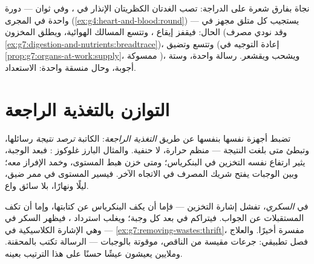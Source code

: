 \begin{example}\label{ex:g8:hormonal-communication:alarm}
نجاة بفارق شعرة على الدراجة: تصب الغدتان الكظريتان
 الإنذار في ، وفي ثوان --- دورة واحدة في
المجرى (\cref{ex:g4:heart-and-blood:round}) --- يستجيب
كل متلق مجهز في الحال: فيقفز إيقاع ، وتتسع المسالك
الهوائية، ويطلق   المخزون (وقد نودي مصرف
\cref{ex:g7:digestion-and-nutrients:breadtrace})، وتتسع
  وتضيق   (إعادة التوجيه
في \cref{prop:g7:organs-at-work:supply}، ممسوكة
)، ويشحب  ويقشعر. رسالة واحدة، وستة أجوبة،
وحال منسقة واحدة: الاستعداد.
\end{example}

\section{التوازن بالتغذية الراجعة}

\begin{proposition}\label{prop:g8:hormonal-communication:feedback}
تضبط أجهزة  نفسها بنفسها عن طريق \emph{التغذية
الراجعة}:  الكاتبة \emph{ترصد
نتيجة} رسائلها، وتبطئ متى بلغت النتيجة --- منظم حرارة،
لا حنفية. والمثال البارز غلوكوز : فبعد الوجبة، يثير
ارتفاع  نفسه  التخزين في البنكرياس؛ ومتى
خزن  هبط المستوى، وخمد الإفراز معه؛ وبين الوجبات
يفتح  شريك المصرف في الاتجاه الآخر. فيسير المستوى
في ممر ضيق، ليلًا ونهارًا، بلا سائق واع.
\end{proposition}
\admitted

\begin{example}\label{ex:g8:hormonal-communication:diabetes}
في \emph{السكري}، تفشل إشارة  التخزين
--- فإما أن يكف البنكرياس عن كتابتها، وإما أن تكف
المستقبلات عن الجواب. فيتراكم  في  بعد كل
وجبة؛ ويغلب استرداد ، فيظهر السكر في  ---
وهي الإشارة الكلاسيكية في
\cref{ex:g7:removing-wastes:thrift}، مفسرة أخيرًا.
والعلاج فصل تطبيقي: جرعات مقيسة من  الناقص،
موقوتة بالوجبات --- الرسالة تكتب بالمحقنة. وملايين
يعيشون عيشًا حسنًا على هذا الترتيب بعينه.
\end{example}

